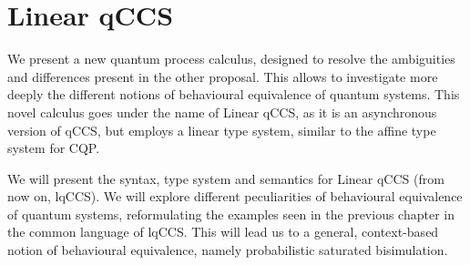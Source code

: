\documentclass[10pt,a4paper, titlepage]{report}
\newcommand{\note}[1]{{\color{red} #1}}
\theoremstyle{remark}
\begin{document}
%
%
%
%
%
%



\chapter{Linear qCCS}

We present a new quantum process calculus, designed to resolve the ambiguities and differences present in the other proposal. This allows to investigate more deeply the different notions of behavioural equivalence of quantum systems. 
This novel calculus goes under the name of Linear qCCS, as it is an asynchronous version of qCCS, but employs a linear type system, similar to the affine type system for CQP.

We will present the syntax, type system and semantics for Linear qCCS (from now on, lqCCS). We will explore different peculiarities of behavioural equivalence of quantum systems, reformulating the examples seen in the previous chapter in the common language of lqCCS. This will lead us to a general, context-based notion of behavioural equivalence, namely probabilistic saturated bisimulation.
\end{document}
